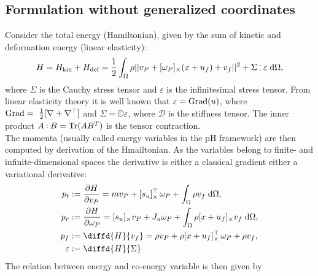 \subsection{Formulation without generalized coordinates}
Consider the total energy (Hamiltonian), given by the sum of kinetic and deformation energy (linear elasticity):
\begin{equation}
\begin{aligned}
H = H_{\text{kin}} + H_{\text{def}} = \frac{1}{2} \int_{\Omega} \rho ||v_P + \crmat{\omega_P} (x+u_f) + v_f||^2 + \Sigma \cddot \varepsilon  \d{\Omega},
\end{aligned}
\end{equation}
where $\Sigma$ is the Cauchy stress tensor and $\varepsilon$ is the infinitesimal stress tensor. From linear elasticity theory it is well known that $\varepsilon = \operatorname*{Grad}(u)$, where $\operatorname*{Grad}=~\frac{1}{2} [\nabla + \nabla^\top]$ and $\Sigma = \mathbb{D} \varepsilon$, where $\mathcal{D}$ is the stiffness tensor. The inner product $A \cddot B = \Tr(A B^T)$ is the tensor contraction. \\  
The momenta (usually called energy variables in the pH framework) are then computed by derivation of the Hmailtonian. As the variables belong to finite- and infinite-dimensional spaces the derivative is either a classical gradient either a variational derivative:
\begin{equation}
\label{eq:momenta}
\begin{aligned}
p_t &:= \diffp{H}{v_P} = m v_P + \crmat{s_u}^\top \, \omega_P + \int_{\Omega} \rho v_f \d{\Omega}, \\
p_r &:= \diffp{H}{\omega_P} = \crmat{s_u} v_P + J_u \omega_P + \int_{\Omega} \rho \crmat{x+u_f} v_f \d{\Omega}, \\
p_f &:= \diffd{H}{v_f} = \rho v_P + \rho \crmat{x+u_f}^\top \, \omega_P + \rho v_f, \\
\varepsilon &:= \diffd{H}{\Sigma}
\end{aligned}
\end{equation}
The relation between energy and co-energy variable is then given by
